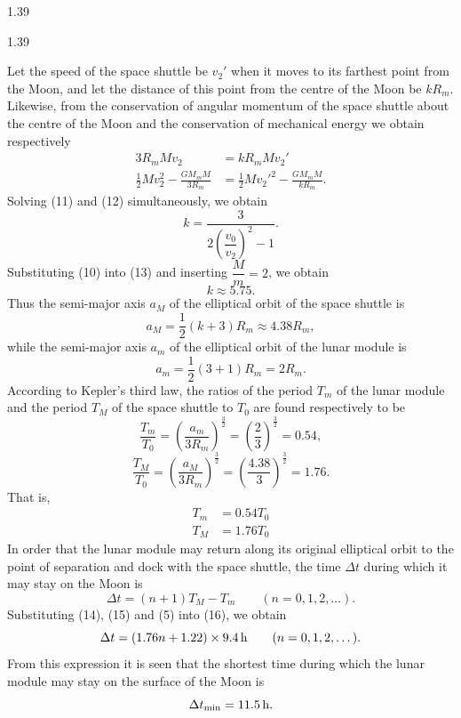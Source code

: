 \begin{solution}{1.39}
\begin{figbox}{1.39}
\end{figbox}

Let the speed of the space shuttle be $v_2'$ when it moves to its farthest point from the Moon, and let the distance of this point from the centre of the Moon be $kR_m$. Likewise, from the conservation of angular momentum of the space shuttle about the centre of the Moon and the conservation of mechanical energy we obtain respectively
\begin{align}
3R_mMv_2 &= kR_mMv_2' \tag{11}\\
\frac{1}{2}Mv_2^2-\frac{GM_mM}{3R_m} &= \frac{1}{2}Mv_2'^2-\frac{GM_mM}{kR_m}. \tag{12}
\end{align}
Solving (11) and (12) simultaneously, we obtain
\begin{equation}
k=\frac{3}{2\left(\dfrac{v_0}{v_2}\right)^2-1}. \tag{13}
\end{equation}
Substituting (10) into (13) and inserting $\dfrac{M}{m}=2$, we obtain
\[
k\approx5.75.
\]
Thus the semi-major axis $a_M$ of the elliptical orbit of the space shuttle is
\[
a_M=\frac{1}{2}(k+3)R_m\approx4.38R_m,
\]
while the semi-major axis $a_m$ of the elliptical orbit of the lunar module is
\[
a_m=\frac{1}{2}(3+1)R_m=2R_m.
\]
According to Kepler's third law, the ratios of the period $T_m$ of the lunar module and the period $T_M$ of the space shuttle to $T_0$ are found respectively to be
\[
\frac{T_m}{T_0}=\left(\frac{a_m}{3R_m}\right)^{\frac{3}{2}}
=\left(\frac{2}{3}\right)^{\frac{3}{2}}=0.54,
\]
\[
\frac{T_M}{T_0}=\left(\frac{a_M}{3R_m}\right)^{\frac{3}{2}}
=\left(\frac{4.38}{3}\right)^{\frac{3}{2}}=1.76.
\]
That is,
\begin{align}
T_m &= 0.54T_0 \tag{14}\\
T_M &= 1.76T_0 \tag{15}
\end{align}
In order that the lunar module may return along its original elliptical orbit to the point of separation and dock with the space shuttle, the time $\Delta t$ during which it may stay on the Moon is
\begin{equation}
\Delta t=(n+1)T_M-T_m\qquad(n=0,1,2,\dots). \tag{16}
\end{equation}
Substituting (14), (15) and (5) into (16), we obtain
\[
\Delta t=(1.76n+1.22)\times9.4\,\mathrm{h}\qquad(n=0,1,2,\dots).
\]
From this expression it is seen that the shortest time during which the lunar module may stay on the surface of the Moon is
\[
\Delta t_{\min}=11.5\,\mathrm{h}.
\]

\end{solution}

